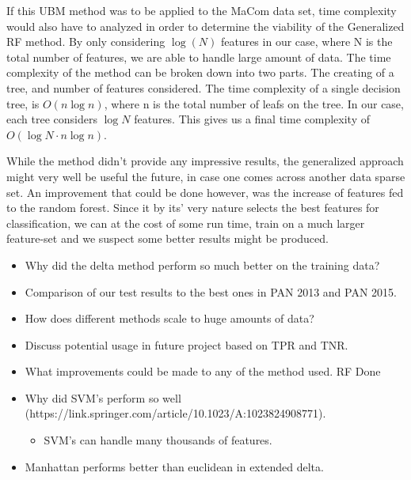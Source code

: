 If this \gls{UBM} method was to be applied to the MaCom data set, time complexity would
also have to analyzed in order to determine the viability of the Generalized RF 
method.
By only considering $\log(N)$ features in our case, 
where N is the total number of features, we are able to handle large amount of data. 
The time complexity of the method can be broken down into two parts.
The creating of a tree, and number of features considered.
The time complexity of a single decision tree, is $O(n \log{n})$, where n is the
total number of leafs on the tree. In our case,
each tree considers $\log{N}$ features. This gives us a final time 
complexity of $O(\log{N} \cdot n \log{n})$.\cite{RFTime}

While the method didn't provide any impressive results, the generalized approach
might very well be useful the future, in case one comes across another data
sparse set. An improvement that could be done however, was the increase of 
features fed to the random forest. Since it by its' very nature
selects the best features for classification, we can at the cost of 
some run time, train on a much larger feature-set and we suspect
some better results might be produced.


\begin{itemize}
    \item Why did the delta method perform so much better on the training data?
    \item Comparison of our test results to the best ones in PAN 2013 and PAN
        2015.
    \item How does different methods scale to huge amounts of data?
    \item Discuss potential usage in future project based on TPR and TNR.
    \item What improvements could be made to any of the method used. RF Done
    \item Why did SVM's perform so well (https://link.springer.com/article/10.1023/A:1023824908771).
        \begin{itemize}
            \item SVM's can handle many thousands of features.
        \end{itemize}
    \item Manhattan performs better than euclidean in extended delta.
\end{itemize}
